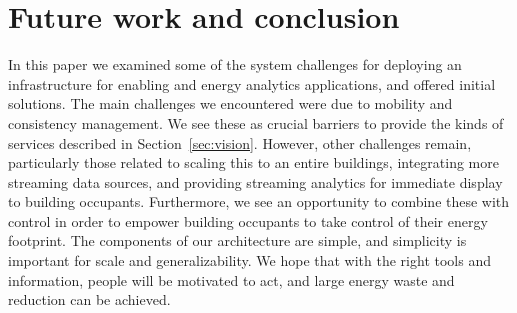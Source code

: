 \section{Future work and conclusion}
In this paper we examined some of the system challenges for deploying an infrastructure for enabling and energy analytics applications, 
and offered initial solutions.  The main challenges we encountered were due to mobility and consistency management.  We
see these as crucial barriers to provide the kinds of services described in Section~\ref{sec:vision}.
However, other challenges remain, particularly those related to scaling this to an entire buildings, integrating
more streaming data sources, and providing streaming analytics for immediate display to building occupants.
Furthermore, we see an opportunity to combine these with control in order to empower building occupants to take
control of their energy footprint.  The components of our architecture are simple, and simplicity is important for scale and
generalizability.  We hope that with the right tools and information, people will be motivated to act, and large
energy waste and reduction can be achieved.